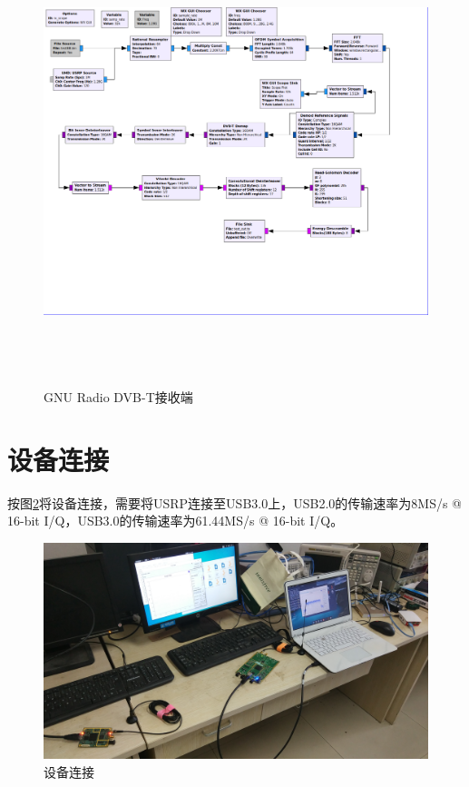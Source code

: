 		\begin{figure}[htb]
			\centering
			\includegraphics[height=13cm,angle=-90]{figures/dvbt_rx.png}
			\caption{GNU Radio DVB-T接收端}
			\label{fig:gnuradio_dvbt_rx}
		\end{figure}
	\section{设备连接}
		\par 按图\ref{fig:devices}将设备连接，需要将USRP连接至USB3.0上，USB2.0的传输速率为8MS/s @ 16-bit I/Q，USB3.0的传输速率为61.44MS/s @ 16-bit I/Q\cite{USRP:SamplingRates}。
		\begin{figure}[htp]
			\centering
			\includegraphics[width=13cm]{figures/devices.jpg}
			\caption{设备连接}
			\label{fig:devices}
		\end{figure}
